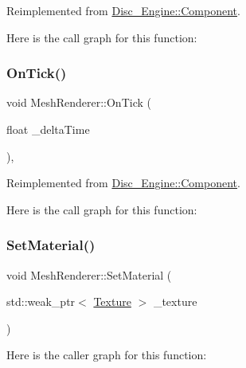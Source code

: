 Reimplemented from \mbox{\hyperlink{class_disc___engine_1_1_component_a3e79ad90d53b156d2c1d784c6051b2c5}{Disc\+\_\+\+Engine\+::\+Component}}.

Here is the call graph for this function\+:
\mbox{\label{class_disc___engine_1_1_mesh_renderer_aa5290108f670218f471ba7553b912c06}} 
\subsubsection{\texorpdfstring{On\+Tick()}{OnTick()}}
{\footnotesize\ttfamily void Mesh\+Renderer\+::\+On\+Tick (\begin{DoxyParamCaption}\item[{float}]{\+\_\+delta\+Time }\end{DoxyParamCaption})\hspace{0.3cm}{\ttfamily [private]}, {\ttfamily [virtual]}}



Reimplemented from \mbox{\hyperlink{class_disc___engine_1_1_component_a7e322d37c3f5fa0181f2321d08b14527}{Disc\+\_\+\+Engine\+::\+Component}}.

Here is the call graph for this function\+:
\mbox{\label{class_disc___engine_1_1_mesh_renderer_ab6080999b90175c224b4590fabba3da2}} 
\subsubsection{\texorpdfstring{Set\+Material()}{SetMaterial()}}
{\footnotesize\ttfamily void Mesh\+Renderer\+::\+Set\+Material (\begin{DoxyParamCaption}\item[{std\+::weak\+\_\+ptr$<$ \mbox{\hyperlink{class_disc___engine_1_1_texture}{Texture}} $>$}]{\+\_\+texture }\end{DoxyParamCaption})}

Here is the caller graph for this function\+:
\mbox{\label{class_disc___engine_1_1_mesh_renderer_ab40ea6de71fb6f9ef7e40348ea13de5b}} 
